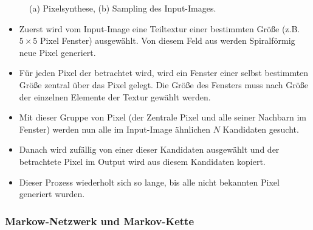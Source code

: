 \documentclass[12pt, a4paper,twoside,openright]{report} %
\begin{document}
\begin{figure}[H]
    \centering
    \qquad
    \caption{(a) Pixelsynthese, (b) Sampling des Input-Images.}%
\end{figure}


\begin{itemize}
    \item Zuerst wird vom Input-Image eine Teiltextur einer bestimmten Größe {(z.B. $5\times 5$ Pixel Fenster)} ausgewählt. Von diesem Feld aus werden Spiralförmig neue Pixel generiert.
    \item Für jeden Pixel der betrachtet wird, wird ein Fenster einer selbst bestimmten Größe zentral über das Pixel gelegt.
    Die Größe des Fensters muss nach Größe der einzelnen Elemente der Textur gewählt werden.
    \item Mit dieser Gruppe von Pixel {(der Zentrale Pixel und alle seiner Nachbarn im Fenster)} werden nun alle im Input-Image ähnlichen $N$ Kandidaten gesucht.
    \item Danach wird zufällig von einer dieser Kandidaten ausgewählt und der betrachtete Pixel im Output wird aus diesem Kandidaten kopiert.
    \item Dieser Prozess wiederholt sich so lange, bis alle nicht bekannten Pixel generiert wurden. \cite[S.4]{GomathiShah2009}
\end{itemize}

\subsubsection{Markow-Netzwerk und Markov-Kette}
\end{document}
